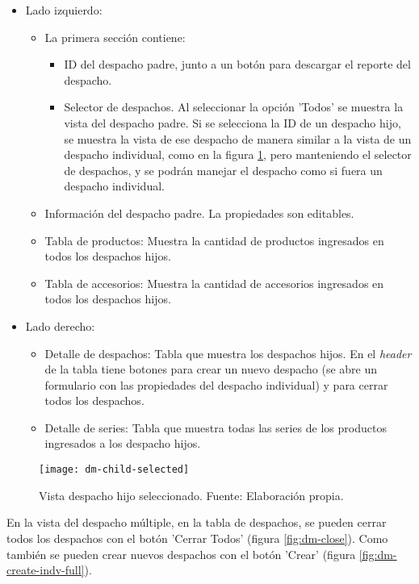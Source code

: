 \begin{itemize}
    \item Lado izquierdo:
    \begin{itemize}
        \item La primera sección contiene:
        \begin{itemize}
            \item ID del despacho padre, junto a un botón para descargar el reporte del despacho.
            \item Selector de despachos. Al seleccionar la opción 'Todos' se muestra la vista del despacho padre. Si se selecciona la ID de un despacho hijo, se muestra la vista de ese despacho de manera similar a la vista de un despacho individual, como en la figura \ref{fig:dm-child-selected}, pero manteniendo el selector de despachos, y se podrán manejar el despacho como si fuera un despacho individual.
        \end{itemize}
        \item Información del despacho padre. La propiedades son editables.
        \item Tabla de productos: Muestra la cantidad de productos ingresados en todos los despachos hijos.
        \item Tabla de accesorios: Muestra la cantidad de accesorios ingresados en todos los despachos hijos.
    \end{itemize}
    \item Lado derecho:
    \begin{itemize}
        \item Detalle de despachos: Tabla que muestra los despachos hijos. En el \textit{header} de la tabla tiene botones para crear un nuevo despacho (se abre un formulario con las propiedades del despacho individual) y para cerrar todos los despachos.
        \item Detalle de series: Tabla que muestra todas las series de los productos ingresados a los despacho hijos.
    \end{itemize}
\end{itemize}

\begin{figure}[H]
	\centering
	\texttt{[image: dm-child-selected]}
	\caption{\label{fig:dm-child-selected} Vista despacho hijo seleccionado. Fuente: Elaboración propia.}
\end{figure}


En la vista del despacho múltiple, en la tabla de despachos, se pueden cerrar todos los despachos con el botón 'Cerrar Todos' (figura \ref{fig:dm-close}). Como también se pueden crear nuevos despachos con el botón 'Crear' (figura \ref{fig:dm-create-indv-full}).

